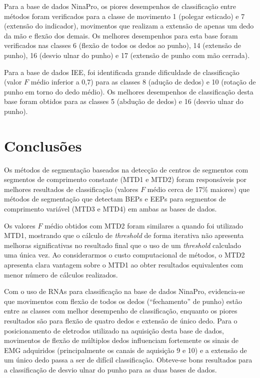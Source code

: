 

Para a base de dados NinaPro, os piores desempenhos de classificação entre métodos foram verificados para a classe de movimento 1 (polegar esticado) e 7 (extensão do indicador), movimentos que realizam a extensão de apenas um dedo da mão e flexão dos demais. Os melhores desempenhos para esta base foram verificados nas classes 6 (flexão de todos os dedos ao punho), 14 (extensão de punho), 16 (desvio ulnar do punho) e 17 (extensão de punho com mão cerrada).

Para a base de dados IEE, foi identificada grande dificuldade de classificação (valor $F$ médio inferior a 0,7) para as classes 8 (adução de dedos) e 10 (rotação de punho em torno do dedo médio). Os melhores desempenhos de classificação desta base foram obtidos para as classes 5 (abdução de dedos) e 16 (desvio ulnar do punho).

	\chapter{Conclusões}
Os métodos de segmentação baseados na detecção de centros de segmentos com segmentos de comprimento constante (MTD1 e MTD2) foram responsáveis por melhores resultados de classificação (valores $F$ médio cerca de 17\% maiores) que métodos de segmentação que detectam BEPs e EEPs para segmentos de comprimento variável (MTD3 e MTD4) em ambas as bases de dados.

Os valores $F$ médio obtidos com MTD2 foram similares a quando foi utilizado MTD1, mostrando que o cálculo de \emph{threshold} de forma iterativa não apresenta melhoras significativas no resultado final que o uso de um \emph{threshold} calculado uma única vez. Ao considerarmos o custo computacional de métodos, o MTD2 apresenta clara vantagem sobre o MTD1 ao obter resultados equivalentes com menor número de cálculos realizados.

Com o uso de RNAs para classificação na base de dados NinaPro, evidencia-se que movimentos com flexão de todos os dedos (``fechamento'' de punho) estão entre as classes com melhor desempenho de classificação, enquanto os piores resultados são para flexão de quatro dedos e extensão de único dedo. Para o posicionamento de eletrodos utilizado na aquisição desta base de dados, movimentos de flexão de múltiplos dedos influenciam fortemente os sinais de EMG adquiridos (principalmente os canais de aquisição 9 e 10) e a extensão de um único dedo passa a ser de difícil classificação. Obteve-se bons resultados para a classificação de desvio ulnar do punho para as duas bases de dados.

